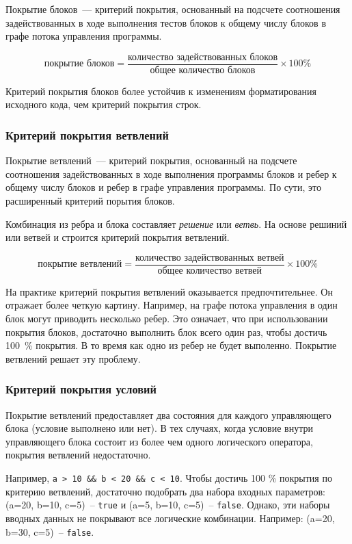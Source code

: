 Покрытие блоков~--- критерий покрытия, основанный на подсчете соотношения задействованных в ходе выполнения тестов блоков к общему числу блоков в графе потока управления программы.

\[ \text{покрытие блоков} = \frac{\text{количество задействованных блоков}}{\text{общее количество блоков}}  \times 100 \% \]

Критерий покрытия блоков более устойчив к изменениям форматирования исходного кода, чем критерий покрытия строк.


\subsubsection{Критерий покрытия ветвлений}

Покрытие ветвлений~--- критерий покрытия, основанный на подсчете соотношения задействованных в ходе выполнения программы блоков и ребер к общему числу блоков и ребер в графе управления программы. По сути, это расширенный критерий порытия блоков. 


Комбинация из ребра и блока составляет \textit{решение} или \textit{ветвь}. На основе решиний или ветвей и строится критерий покрытия ветвлений.

\[ \text{покрытие ветвлений} = \frac{\text{количество задействованных ветвей}}{\text{общее количество ветвей}}  \times 100 \% \]


На практике критерий покрытия ветвлений оказывается предпочтительнее. Он отражает более четкую картину. Например, на графе потока управления в один блок могут приводить несколько ребер. Это означает, что при использовании покрытия блоков, достаточно выполнить блок всего один раз, чтобы достичь 100~\% покрытия. В то время как одно из ребер не будет выполенно. Покрытие ветвлений решает эту проблему.

\subsubsection{Критерий покрытия условий}

Покрытие ветвлений предоставляет два состояния для каждого управляющего блока (условие выполнено или нет). В тех случаях, когда условие внутри управляющего блока состоит из более чем одного логического оператора, покрытия ветвлений недостаточно. 

Например, \texttt{a > 10 \&\& b < 20 \&\& c < 10}. Чтобы достичь 100 \% покрытия по критерию ветвлений, достаточно подобрать два набора входных параметров: (a=20, b=10, c=5)~-- \texttt{true} и (a=5, b=10, c=5)~-- \texttt{false}. Однако, эти наборы вводных данных не покрывают все логические комбинации. Например: (a=20, b=30, c=5)~-- \texttt{false}.

